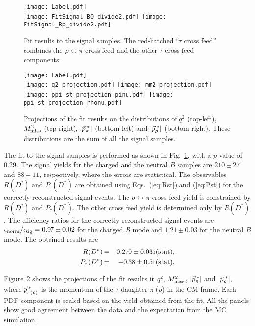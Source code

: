 \documentclass[aps,prd,twocolumn,superscriptaddress,showpacs,preprintnumbers,amsmath,amssymb]{revtex4-1}
\begin{document}
\begin{figure*}[p!]
  \centering
  \texttt{[image: Label.pdf]}\\
  \texttt{[image: FitSignal\_B0\_divide2.pdf]}
  \texttt{[image: FitSignal\_Bp\_divide2.pdf]}
  \caption{Fit results to the signal samples. The red-hatched ``$\tau$ cross feed'' combines the $\rho \leftrightarrow \pi$ cross feed and the other $\tau$ cross feed components.}
  \label{fig:fitresult}
\end{figure*}

\begin{figure*}[t!]
  \centering
  \texttt{[image: Label.pdf]}\\
  \texttt{[image: q2\_projection.pdf]}
  \texttt{[image: mm2\_projection.pdf]}
  \texttt{[image: ppi\_st\_projection\_pinu.pdf]}
  \texttt{[image: ppi\_st\_projection\_rhonu.pdf]}
  \caption{Projections of the fit results on the distributions of $q^2$ (top-left), $M_{\rm miss}^2$ (top-right), $|\vec{p}_\pi^{\kern2pt *}|$ (bottom-left) and $|\vec{p}_\rho^{\kern2pt *}|$ (bottom-right). These distributions are the sum of all the signal samples.}
  \label{fig:fitresult-projection}
\end{figure*}

The fit to the signal samples is performed as shown in Fig.~\ref{fig:fitresult}, with a $p$-value of 0.29. The signal yields for the charged and the neutral $B$ samples are $210 \pm 27$ and $88 \pm 11$, respectively, where the errors are statistical. The observables $R(D^*)$ and $P_\tau(D^*)$ are obtained using Eqs.~(\ref{eq:Rst}) and (\ref{eq:Pst}) for the correctly reconstructed signal events. The $\rho \leftrightarrow \pi$ cross feed yield is constrained by $R(D^*)$ and $P_\tau(D^*)$. The other cross feed yield is determined only by $R(D^*)$. The efficiency ratios for the correctly reconstructed signal events are $\epsilon_{\rm norm} / \epsilon_{\rm sig} = 0.97 \pm 0.02$ for the charged $B$ mode and $1.21 \pm 0.03$ for the neutral $B$ mode. The obtained results are
\begin{eqnarray}
  R(D^*)   &=& 0.270 \pm 0.035 ({\rm stat}),\\
  P_\tau(D^*) &=& -0.38 \pm 0.51 ({\rm stat}).
\end{eqnarray}

Figure~\ref{fig:fitresult-projection} shows the projections of the fit results in $q^2$, $M_{\rm miss}^2$, $|\vec{p}_\pi^{\kern2pt *}|$ and $|\vec{p}_\rho^{\kern2pt *}|$, where $\vec{p}_{\pi(\rho)}^{\kern2pt *}$ is the momentum of the $\tau$-daughter $\pi$ ($\rho$) in the CM frame. Each PDF component is scaled based on the yield obtained from the fit. All the panels show good agreement between the data and the expectation from the MC simulation.
\end{document}
